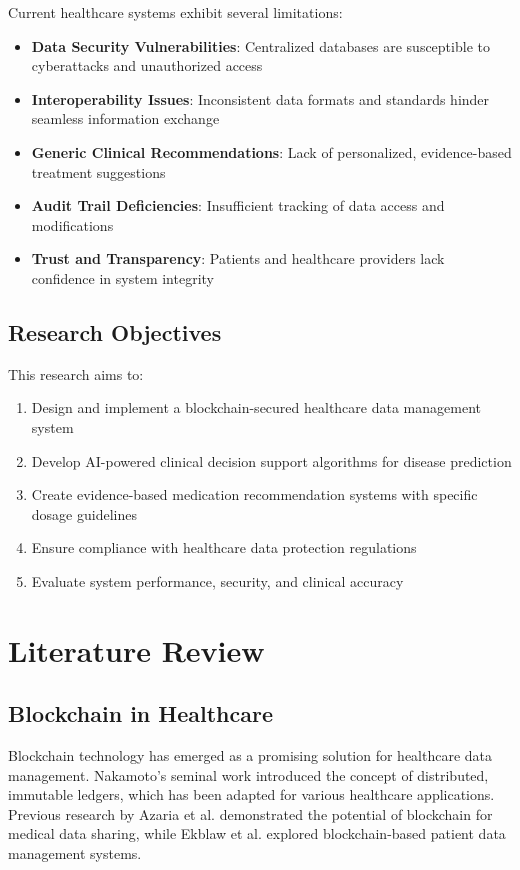 \documentclass[conference]{IEEEtran}
\begin{document}
Current healthcare systems exhibit several limitations:
\begin{itemize}
    \item \textbf{Data Security Vulnerabilities}: Centralized databases are susceptible to cyberattacks and unauthorized access
    \item \textbf{Interoperability Issues}: Inconsistent data formats and standards hinder seamless information exchange
    \item \textbf{Generic Clinical Recommendations}: Lack of personalized, evidence-based treatment suggestions
    \item \textbf{Audit Trail Deficiencies}: Insufficient tracking of data access and modifications
    \item \textbf{Trust and Transparency}: Patients and healthcare providers lack confidence in system integrity
\end{itemize}

\subsection{Research Objectives}

This research aims to:
\begin{enumerate}
    \item Design and implement a blockchain-secured healthcare data management system
    \item Develop AI-powered clinical decision support algorithms for disease prediction
    \item Create evidence-based medication recommendation systems with specific dosage guidelines
    \item Ensure compliance with healthcare data protection regulations
    \item Evaluate system performance, security, and clinical accuracy
\end{enumerate}

\section{Literature Review}

\subsection{Blockchain in Healthcare}

Blockchain technology has emerged as a promising solution for healthcare data management. Nakamoto's seminal work \cite{nakamoto2008} introduced the concept of distributed, immutable ledgers, which has been adapted for various healthcare applications. Previous research by Azaria et al. \cite{azaria2016} demonstrated the potential of blockchain for medical data sharing, while Ekblaw et al. \cite{ekblaw2016} explored blockchain-based patient data management systems.
\end{document}
